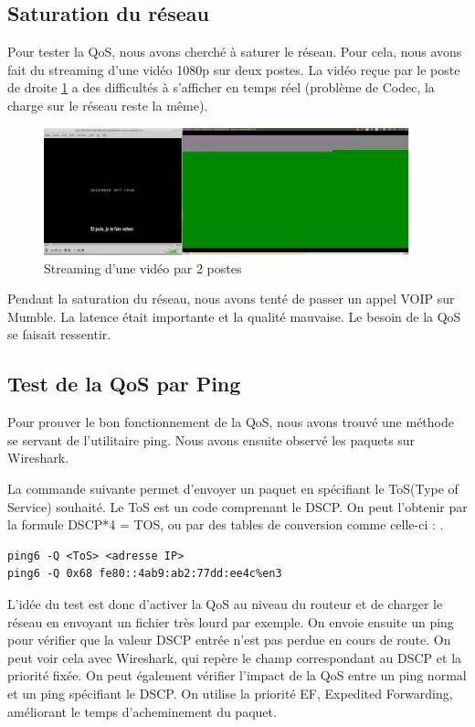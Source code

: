     \subsection{Saturation du réseau}
       
    Pour tester la QoS, nous avons cherché à saturer le réseau. Pour cela, nous avons fait du streaming d'une vidéo 1080p sur deux postes. La vidéo reçue par le poste de droite \ref{vlc-compar} a des difficultés à s'afficher en temps réel (problème de Codec, la charge sur le réseau reste la même).
		\begin{figure}[h]
        \includegraphics[width=400px]{figures/vlc-stream-compar.png}
        \centering
        \caption{Streaming d'une vidéo par 2 postes}
        \label{vlc-compar}
        \end{figure}
	
    Pendant la saturation du réseau, nous avons tenté de passer un appel VOIP sur Mumble. La latence était importante et la qualité mauvaise. Le besoin de la QoS se faisait ressentir.
      
    \subsection{Test de la QoS par Ping}
    
    Pour prouver le bon fonctionnement de la QoS, nous avons trouvé une méthode se servant de l'utilitaire ping. Nous avons ensuite observé les paquets sur Wireshark. 
    
    La commande suivante permet d'envoyer un paquet en spécifiant le ToS(Type of Service) souhaité. Le ToS est un code comprenant le DSCP. On peut l'obtenir par la formule DSCP*4 = TOS, ou par des tables de conversion comme celle-ci : \cite{TOSDSCP}.
        \begin{lstlisting}[frame=single]
ping6 -Q <ToS> <adresse IP>
ping6 -Q 0x68 fe80::4ab9:ab2:77dd:ee4c%en3
        \end{lstlisting}  
  
    L'idée du test est donc d'activer la QoS au niveau du routeur et de charger le réseau en envoyant un fichier très lourd par exemple. On envoie ensuite un ping pour vérifier que la valeur DSCP entrée n'est pas perdue en cours de route. On peut voir cela avec Wireshark, qui repère le champ correspondant au DSCP et la priorité fixée. On peut également vérifier l'impact de la QoS entre un ping normal et un ping spécifiant le DSCP. On utilise la priorité EF, Expedited Forwarding, améliorant le temps d'acheminement du paquet.
    
